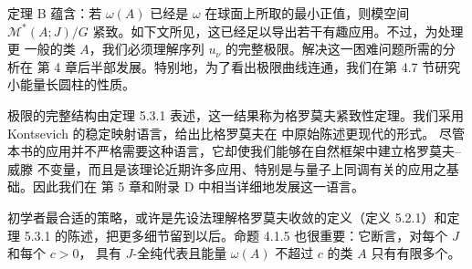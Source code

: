 定理 B 蕴含：若 $\omega(A)$ 已经是 $\omega$ 在球面上所取的最小正值，则模空间
$\mathcal M^*(A;J)/G$ 紧致。如下文所见，这已经足以导出若干有趣应用。不过，为处理更
一般的类 $A$，我们必须理解序列 $u_\nu$ 的完整极限。解决这一困难问题所需的分析在
第 4 章后半部发展。特别地，为了看出极限曲线连通，我们在第 4.7 节研究小能量长圆柱的性质。

极限的完整结构由定理 5.3.1 表述，这一结果称为格罗莫夫紧致性定理。我们采用
Kontsevich 的稳定映射语言，给出比格罗莫夫在  中原始陈述更现代的形式。
尽管本书的应用并不严格需要这种语言，它却使我们能够在自然框架中建立格罗莫夫--威滕
不变量，而且是该理论近期许多应用、特别是与量子上同调有关的应用之基础。因此我们在
第 5 章和附录 D 中相当详细地发展这一语言。

初学者最合适的策略，或许是先设法理解格罗莫夫收敛的定义（定义 5.2.1）和定理 5.3.1
的陈述，把更多细节留到以后。命题 4.1.5 也很重要：它断言，对每个 $J$ 和每个 $c>0$，
具有 $J$-全纯代表且能量 $\omega(A)$ 不超过 $c$ 的类 $A$ 只有有限多个。
